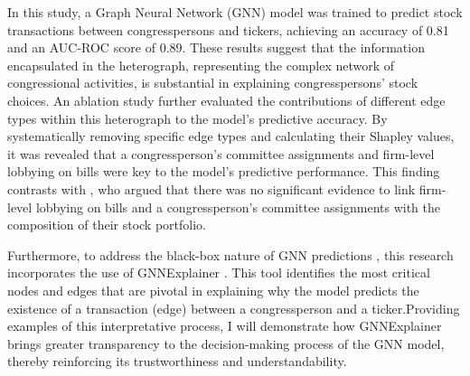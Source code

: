 \documentclass[15pt,letterpaper]{article}
\begin{document}

In this study, a Graph Neural Network (GNN) model was trained to predict stock transactions between congresspersons and tickers, achieving an accuracy of 0.81 and an AUC-ROC score of 0.89. These results suggest that the information encapsulated in the heterograph, representing the complex network of congressional activities, is substantial in explaining congresspersons' stock choices. An ablation study further evaluated the contributions of different edge types within this heterograph to the model's predictive accuracy. By systematically removing specific edge types and calculating their Shapley values, it was revealed that a congressperson’s committee assignments and firm-level lobbying on bills were key to the model's predictive performance. This finding contrasts with \cite{eg14}, who argued that there was no significant evidence to link firm-level lobbying on bills and a congressperson’s committee assignments with the composition of their stock portfolio.

Furthermore, to address the black-box nature of GNN predictions \citep{bb1, bb2, bb3}, this research incorporates the use of GNNExplainer \citep{gex}. This tool identifies the most critical nodes and edges that are pivotal in explaining why the model predicts the existence of a transaction (edge) between a congressperson and a ticker.Providing examples of this interpretative process, I will demonstrate how GNNExplainer brings greater transparency to the decision-making process of the GNN model, thereby reinforcing its trustworthiness and understandability. 
\end{document}
